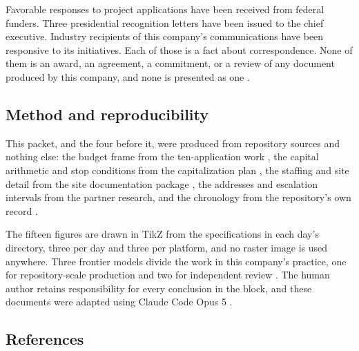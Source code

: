 Favorable responses to project applications have been received from federal
funders. Three presidential recognition letters have been issued to the chief
executive. Industry recipients of this company's communications have been
responsive to its initiatives. Each of those is a fact about correspondence. None
of them is an award, an agreement, a commitment, or a review of any document
produced by this company, and none is presented as one \cite{movein2026}.

\subsection{Method and reproducibility}

This packet, and the four before it, were produced from repository sources and
nothing else: the budget frame from the ten-application work \cite{tenapps2026},
the capital arithmetic and stop conditions from the capitalization plan
\cite{capitalplan2026}, the staffing and site detail from the site documentation
package \cite{movein2026}, the addresses and escalation intervals from the
partner research, and the chronology from the repository's own record
\cite{daraxstory2026}.

The fifteen figures are drawn in TikZ from the specifications in each day's
 directory, three per day and three per platform, and no raster
image is used anywhere. Three frontier models divide the work in this company's
practice, one for repository-scale production and two for independent review
\cite{tripartisan2026}. The human author retains responsibility for every
conclusion in the block, and these documents were adapted using Claude Code Opus
5 \cite{repo2026}.

\subsection{References}

\begin{apprefs}


\end{apprefs}
